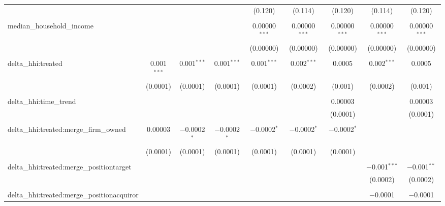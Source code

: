 \begin{table}[H]
{\begin{tabular}{@{\extracolsep{5pt}}lcccccccc}
   &  &  &  & (0.120) & (0.114) & (0.120) & (0.114) & (0.120) \\  

   & & & & & & & & \\  

  median\_household\_income &  &  &  & 0.00000$^{***}$ & 0.00000$^{***}$ & 0.00000$^{***}$ & 0.00000$^{***}$ & 0.00000$^{***}$ \\  

   &  &  &  & (0.00000) & (0.00000) & (0.00000) & (0.00000) & (0.00000) \\  

   & & & & & & & & \\  

  delta\_hhi:treated & 0.001$^{***}$ & 0.001$^{***}$ & 0.001$^{***}$ & 0.001$^{***}$ & 0.002$^{***}$ & 0.0005 & 0.002$^{***}$ & 0.0005 \\  

   & (0.0001) & (0.0001) & (0.0001) & (0.0001) & (0.0002) & (0.001) & (0.0002) & (0.001) \\  

   & & & & & & & & \\  

  delta\_hhi:time\_trend &  &  &  &  &  & 0.00003 &  & 0.00003 \\  

   &  &  &  &  &  & (0.0001) &  & (0.0001) \\  

   & & & & & & & & \\  

  delta\_hhi:treated:merge\_firm\_owned & 0.00003 & $-$0.0002$^{*}$ & $-$0.0002$^{*}$ & $-$0.0002$^{*}$ & $-$0.0002$^{*}$ & $-$0.0002$^{*}$ &  &  \\  

   & (0.0001) & (0.0001) & (0.0001) & (0.0001) & (0.0001) & (0.0001) &  &  \\  

   & & & & & & & & \\  

  delta\_hhi:treated:merge\_positiontarget &  &  &  &  &  &  & $-$0.001$^{***}$ & $-$0.001$^{**}$ \\  

   &  &  &  &  &  &  & (0.0002) & (0.0002) \\  

   & & & & & & & & \\  

  delta\_hhi:treated:merge\_positionacquiror &  &  &  &  &  &  & $-$0.0001 & $-$0.0001 \\  


\end{tabular}}
\end{table}
